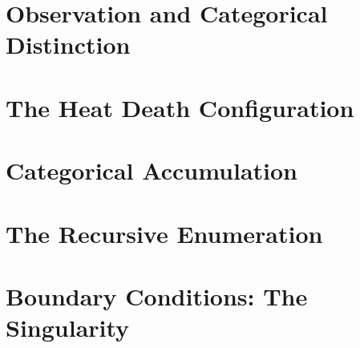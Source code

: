 \section{Observation and Categorical Distinction}


\section{The Heat Death Configuration}


\section{Categorical Accumulation}


\section{The Recursive Enumeration}


\section{Boundary Conditions: The Singularity}


